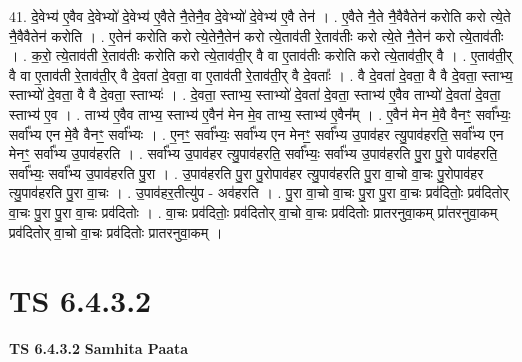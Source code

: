 \documentclass[17pt]{extarticle}
\begin{document}
41. दे॒वेभ्य॑ ए॒वैव दे॒वेभ्यो॑ दे॒वेभ्य॑ ए॒वैते नै॒तेनै॒व दे॒वेभ्यो॑ दे॒वेभ्य॑ ए॒वै तेन॑ । . ए॒वैते नै॒ते नै॒वैवैतेन॑ करोति करो त्ये॒ते नै॒वैवैतेन॑ करोति । . ए॒तेन॑ करोति करो त्ये॒तेनै॒तेन॑ करो त्ये॒ताव॑ती रे॒ताव॑तीः करो त्ये॒ते नै॒तेन॑ करो त्ये॒ताव॑तीः । . क॒रो॒ त्ये॒ताव॑ती रे॒ताव॑तीः करोति करो त्ये॒ताव॑ती॒र् वै वा ए॒ताव॑तीः करोति करो त्ये॒ताव॑ती॒र् वै । . ए॒ताव॑ती॒र् वै वा ए॒ताव॑ती रे॒ताव॑ती॒र् वै दे॒वता॑ दे॒वता॒ वा ए॒ताव॑ती रे॒ताव॑ती॒र् वै दे॒वताः᳚ । . वै दे॒वता॑ दे॒वता॒ वै वै दे॒वता॒ स्ताभ्य॒ स्ताभ्यो॑ दे॒वता॒ वै वै दे॒वता॒ स्ताभ्यः॑ । . दे॒वता॒ स्ताभ्य॒ स्ताभ्यो॑ दे॒वता॑ दे॒वता॒ स्ताभ्य॑ ए॒वैव ताभ्यो॑ दे॒वता॑ दे॒वता॒ स्ताभ्य॑ ए॒व । . ताभ्य॑ ए॒वैव ताभ्य॒ स्ताभ्य॑ ए॒वैन॑ मेन मे॒व ताभ्य॒ स्ताभ्य॑ ए॒वैन᳚म् । . ए॒वैन॑ मेन मे॒वै वैनꣳ॒॒ सर्वा᳚भ्यः॒ सर्वा᳚भ्य एन मे॒वै वैनꣳ॒॒ सर्वा᳚भ्यः । . ए॒नꣳ॒॒ सर्वा᳚भ्यः॒ सर्वा᳚भ्य एन मेनꣳ॒॒ सर्वा᳚भ्य उ॒पाव॑हर त्यु॒पाव॑हरति॒ सर्वा᳚भ्य एन मेनꣳ॒॒ सर्वा᳚भ्य उ॒पाव॑हरति । . सर्वा᳚भ्य उ॒पाव॑हर त्यु॒पाव॑हरति॒ सर्वा᳚भ्यः॒ सर्वा᳚भ्य उ॒पाव॑हरति पु॒रा पु॒रो पाव॑हरति॒ सर्वा᳚भ्यः॒ सर्वा᳚भ्य उ॒पाव॑हरति पु॒रा । . उ॒पाव॑हरति पु॒रा पु॒रोपाव॑हर त्यु॒पाव॑हरति पु॒रा वा॒चो वा॒चः पु॒रोपाव॑हर त्यु॒पाव॑हरति पु॒रा वा॒चः । . उ॒पाव॑हर॒तीत्यु॑प - अव॑हरति । . पु॒रा वा॒चो वा॒चः पु॒रा पु॒रा वा॒चः प्रव॑दितोः॒ प्रव॑दितोर् वा॒चः पु॒रा पु॒रा वा॒चः प्रव॑दितोः । . वा॒चः प्रव॑दितोः॒ प्रव॑दितोर् वा॒चो वा॒चः प्रव॑दितोः प्रातरनुवा॒कम् प्रा॑तरनुवा॒कम् प्रव॑दितोर् वा॒चो वा॒चः प्रव॑दितोः प्रातरनुवा॒कम् । \newline
\pagebreak
{}

\section{ TS 6.4.3.2 }

\textbf{TS 6.4.3.2 } \newline
\textbf{Samhita Paata} \newline
\end{document}
